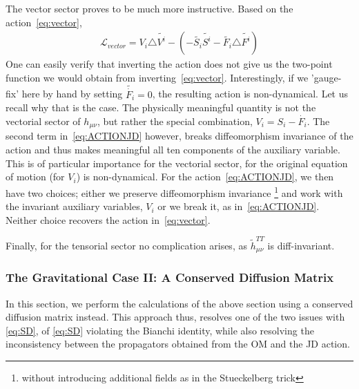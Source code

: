 \documentclass[aps,preprintnumbers,superscriptaddress,longbibliography]{revtex4-1}
\begin{document}
The vector sector proves to be much more instructive. Based on the action~\eqref{eq:vector},
\begin{align}
    \mathcal{L}_{vector}=V_i\triangle \tilde{V^i}-(-\tilde{S_i}\tilde{S^i}-\tilde{F_i}\triangle\tilde{F^i})
\end{align}
One can easily verify that inverting the action does not give us the two-point function we would obtain from inverting~\eqref{eq:vector}. Interestingly, if we 'gauge-fix' here by hand by setting $\tilde{\dot{F_i}}=0$, the resulting action is non-dynamical. Let us recall why that is the case. The physically meaningful quantity is not the vectorial sector of $h_{\mu\nu}$, but rather the special combination, $V_i=S_i-\dot{F_i}$.  The second term in~\eqref{eq:ACTIONJD} however, breaks diffeomorphism invariance of the action and thus makes meaningful all ten components of the auxiliary variable. This is of particular importance for the vectorial sector, for the original equation of motion (for $V_i$) is non-dynamical. For the action~\eqref{eq:ACTIONJD}, we then have two choices; either we preserve diffeomorphism invariance \footnote{without introducing additional fields as in the Stueckelberg trick} and work with the invariant auxiliary variables, $V_i$ or we break it, as in~\eqref{eq:ACTIONJD}. Neither choice recovers the action in~\eqref{eq:vector}. 

Finally, for the tensorial sector no complication arises, as $\tilde{h}_{\mu\nu}^{TT}$ is diff-invariant.

\subsubsection{The Gravitational Case II: A Conserved Diffusion Matrix}

In this section, we perform the calculations of the above section using a conserved diffusion matrix instead. This approach thus, resolves one of the two issues with \eqref{eq:SD}, of \eqref{eq:SD} violating the Bianchi identity, while also resolving the inconsistency between the propagators obtained from the OM and the JD action.
\end{document}
